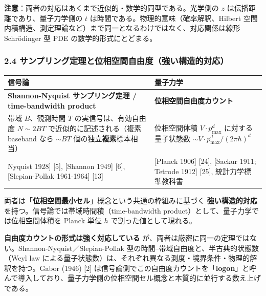 \documentclass[
]{ltjsarticle}
\newcounter{none} %
\begin{document}
\textbf{注意}：両者の対応はあくまで近似的・数学的同型である。光学側の
\(z\) は伝播距離であり、量子力学側の \(t\)
は時間である。物理的意味（確率解釈、Hilbert
空間内積構造、測定理論など）まで同一となるわけではなく、対応関係は線形
Schrödinger 型 PDE の数学的形式にとどまる。

\subsubsection{2.4
サンプリング定理と位相空間自由度（強い構造的対応）}\label{ux30b5ux30f3ux30d7ux30eaux30f3ux30b0ux5b9aux7406ux3068ux4f4dux76f8ux7a7aux9593ux81eaux7531ux5ea6ux5f37ux3044ux69cbux9020ux7684ux5bfeux5fdc}

{\def\LTcaptype{none} %
\begin{longtable}[]{@{}
  >{\raggedright\arraybackslash}p{}
  >{\raggedright\arraybackslash}p{}@{}}
\toprule\noalign{}
\begin{minipage}[b]{\linewidth}\raggedright
信号論
\end{minipage} & \begin{minipage}[b]{\linewidth}\raggedright
量子力学
\end{minipage} \\
\midrule\noalign{}
\endhead
\bottomrule\noalign{}
\endlastfoot
\textbf{Shannon-Nyquist サンプリング定理 / time-bandwidth product} &
\textbf{位相空間自由度カウント} \\
帯域 \(B\)、観測時間 \(T\) の実信号は、有効自由度 \(N \sim 2BT\)
で近似的に記述される（複素 baseband なら \(\sim BT\)
個の独立\textbf{複素}標本相当） & 位相空間体積 \(V \cdot p_{\max}^d\)
に対する量子状態数 \(\sim V \cdot p_{\max}^d / (2\pi\hbar)^d\) \\
{[}Nyquist 1928{]} {[}5{]}, {[}Shannon 1949{]} {[}6{]},
{[}Slepian-Pollak 1961-1964{]} {[}13{]} & {[}Planck 1906{]} {[}24{]},
{[}Sackur 1911; Tetrode 1912{]} {[}25{]}, 統計力学標準教科書 \\
\end{longtable}
}

両者は「\textbf{位相空間最小セル}」概念という共通の枠組みに基づく
\textbf{強い構造的対応} を持つ。信号論では帯域時間積（time-bandwidth
product）として、量子力学では位相空間体積を Planck 単位 \(h\)
で割った値として現れる。

\textbf{自由度カウントの形式は強く対応している}
が、両者は厳密に同一の定理ではない。Shannon-Nyquist／Slepian-Pollak
型の時間--帯域自由度と、半古典的状態数（Weyl law
による量子状態数）は、それぞれ異なる測度・境界条件・物理的解釈を持つ。Gabor
(1946) {[}2{]}
は信号論側でこの自由度カウントを「\textbf{logon}」と呼んで導入しており、量子力学側の位相空間セル概念と本質的に並行する数え上げである。
\end{document}

